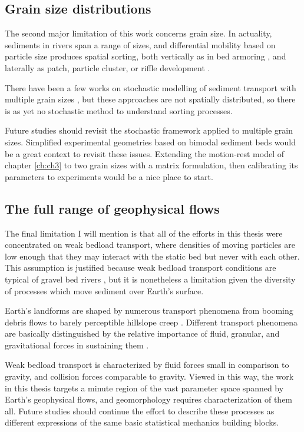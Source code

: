 \subsection{Grain size distributions}

The second major limitation of this work concerns grain size.
In actuality, sediments in rivers span a range of sizes, and differential mobility based on particle size produces spatial sorting, both vertically as in bed armoring \citep{Parker1982,Wilcock1989,Aberle2006}, and laterally as patch, particle cluster, or riffle development \citep{Nelson2014,Venditti2017}.

There have been a few works on stochastic modelling of sediment transport with multiple grain sizes \citep{Sun2000,Parker2000}, but these approaches are not spatially distributed, so there is as yet no stochastic method to understand sorting processes. 

Future studies should revisit the stochastic framework applied to multiple grain sizes. Simplified experimental geometries based on bimodal sediment beds \citep[e.g.][]{Houssais2012} would be a great context to revisit these issues. Extending the motion-rest model of chapter \ref{ch:ch3} to two grain sizes with a matrix formulation, then calibrating its parameters to experiments would be a nice place to start.

\subsection{The full range of geophysical flows}

The final limitation I will mention is that all of the efforts in this thesis were concentrated on weak bedload transport, where densities of moving particles are low enough that they may interact with the static bed but never with each other. This assumption is justified because weak bedload transport conditions are typical of gravel bed rivers \citep{Ashworth1989,Warburton1992}, but it is nonetheless a limitation given the diversity of processes which move sediment over Earth's surface.

Earth's landforms are shaped by numerous transport phenomena from booming debris flows \citep{Iverson1997} to barely perceptible hillslope creep \citep{Deshpande2021}.
Different transport phenomena are basically distinguished by the relative importance of fluid, granular, and gravitational forces in sustaining them \citep{Jerolmack2019}.

Weak bedload transport is characterized by fluid forces small in comparison to gravity, and collision forces comparable to gravity.
Viewed in this way, the work in this thesis targets a minute region of the vast parameter space spanned by Earth's geophysical flows, and geomorphology requires characterization of them all.
Future studies should continue the effort \citep[e.g.][]{Furbish2021a} to describe these processes as different expressions of the same basic statistical mechanics building blocks.

